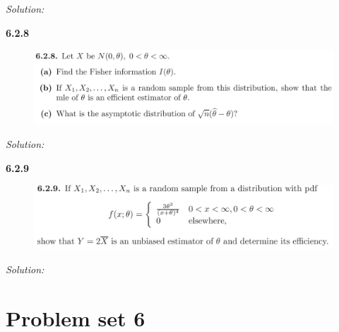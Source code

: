\documentclass{book}
\theoremstyle{definition}
\begin{document}
\noindent \textit{Solution:}













\newpage
\noindent \textbf{6.2.8}
\begin{figure}[!htb]
	\centering
	\includegraphics[scale=0.25]{628}
\end{figure}


\noindent \textit{Solution:}













\newpage
\noindent \textbf{6.2.9}
\begin{figure}[!htb]
	\centering
	\includegraphics[scale=0.25]{629}
\end{figure}


\noindent \textit{Solution:}









\newpage










\section{Problem set 6}

	
	
\end{document}
